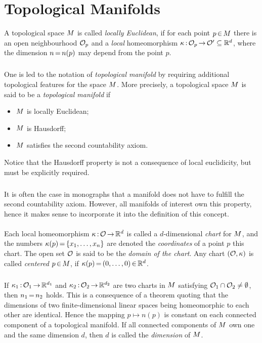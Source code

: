 \documentclass[11pt,twoside]{article}
\begin{document}
\section{Topological Manifolds}
A topological space ${M}$ is called \textit{locally Euclidean},
if for each point $p {\,\in\,} {M}$ there is an open neighbourhood $\mathcal{O}_p$
and a \textit{local} homeomorphism
$\kappa {\,:\,} \mathcal{O}_p {\,\to\,} \mathcal{O}' \subseteq {\mathbb{R}}^d$,
where the dimension $n {\,=\,} n(p)$ may depend from the point $p$.

\subparagraph{} %
One is led to the notation of \textit{topological manifold}
by requiring additional topological features for the space ${M}$.
More precisely,
a topological space ${M}$ is said to be a \textit{topological manifold}
if 
\begin{itemize}[leftmargin=45pt]
\item[(M-1)]
${M}$ is locally Euclidean;
\item[(M-2)]
${M}$ is Hausdorff;
\item[(M-3)]
${M}$ satisfies the second countability axiom.
\end{itemize}

Notice that the Hausdorff property is not a consequence of local euclidicity,
but must be explicitly required.

\subparagraph{}
It is often the case in monographs that a manifold does not have to fulfill
the second countability axiom.
However,
all manifolds of interest own this property,
hence it makes sense to incorporate it into the definition of this concept.

\paragraph{} %
Each local homeomorphism $\kappa {\,:\,} \mathcal{O} {\,\to\,} {\mathbb{R}}^d$
is called a $d$-dimensional \textit{chart} for ${M}$,
and the numbers $\kappa(p) {\,=\,} \{x_1,\ldots,x_n\}$ are denoted
the \textit{coordinates} of a point $p$ {\wrt} this chart.
The open set $\mathcal{O}$ is said to be the \textit{domain of the chart}.
Any chart $(\mathcal{O},\kappa)$ is called \textit{centered} {\wrt} $p {\,\in\,} {M}$,
if $\kappa(p) {\,=\,} (0,\ldots,0) {\,\in\,} {\mathbb{R}}^d$.

\subparagraph{}
If $\kappa_1 {\,:\,} \mathcal{O}_1 {\,\to\,} {\mathbb{R}}^{d_1}$ and $\kappa_2 {\,:\,} \mathcal{O}_2 {\,\to\,} {\mathbb{R}}^{d_2}$
are two charts in ${M}$ satisfying
$\mathcal{O}_1 \cap \mathcal{O}_2 \neq \emptyset$,
then $n_1 {\,=\,} n_2$ holds.
This is a consequence of a theorem quoting 
that the dimensions of two finite-dimensional linear spaces
being homeomorphic to each other are identical.
Hence the mapping $p \mapsto n(p)$ is constant on each connected component
of a topological manifold.
If all connected components of ${M}$ own one and the same dimension $d$,
then $d$ is called the \textit{dimension} of ${M}$.
\end{document}
